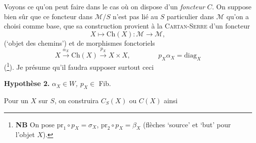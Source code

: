 \documentclass[11pt]{article}
\newcommand{\msp}[1]{\marginpar{\footnotesize [#1]}}
\begin{document}
Voyons ce qu'on peut faire dans le cas où on dispose d'un \textit{foncteur} $C$. On suppose bien sûr que ce foncteur dans $\mathcal{M}/S$ \msp{page 101} n'est pas lié au $S$ particulier dans $\mathcal{M}$ qu'on a choisi comme base, que sa construction provient à la \textsc{Cartan-Serre} d'un foncteur
\[
X \longmapsto \mathrm{Ch}(X) : \mathcal{M} \longrightarrow \mathcal{M},
\]
(`objet des chemins') et de morphismes fonctoriels
\[
X \xrightarrow{\alpha_X} \mathrm{Ch}(X) \xrightarrow{p_X} X \times X, \qquad\qquad \boxed{p_X\alpha_X = \mathrm{diag}_X}
\]
(\footnote[58]{\textbf{NB} On pose $\mathrm{pr}_1 \circ p_X = \sigma_X$, $\mathrm{pr}_2 \circ p_X = \beta_X$ (flèches `source' et `but' pour l'objet $X$).}). Je présume qu'il faudra supposer surtout ceci

\textbf{Hypothèse 2.} \textit{$\alpha_X \in W$, $p_X \in$} Fib.

Pour un $X$ sur $S$, on construira $C_S(X)$ ou $C(X)$ ainsi
\end{document}
